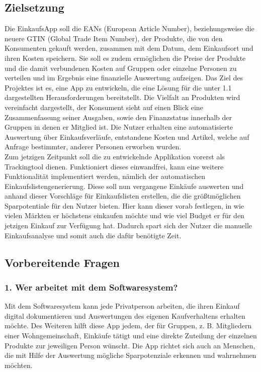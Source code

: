 \documentclass[12pt,a4paper]{article}
\begin{document}
\subsection{Zielsetzung}
Die EinkaufsApp soll die EANs (European Article Number), beziehungsweise die neuere GTIN (Global Trade Item Number), der Produkte, die von den Konsumenten gekauft werden, zusammen mit dem Datum, dem Einkaufsort und ihren Kosten speichern.
Sie soll es zudem ermöglichen die Preise der Produkte und die damit verbundenen Kosten auf Gruppen oder einzelne Personen zu verteilen und im Ergebnis eine finanzielle Auswertung aufzeigen.
Das Ziel des Projektes ist es, eine App zu entwickeln, die eine Lösung für die unter 1.1 dargestellten Herausforderungen bereitstellt. 
Die Vielfalt an Produkten wird vereinfacht dargestellt, der Konsument sieht auf einen Blick eine Zusammenfassung seiner Ausgaben, sowie den Finanzstatus innerhalb der Gruppen in denen er Mitglied ist. Die Nutzer erhalten eine automatisierte Auswertung über Einkaufsverläufe, entstandene Kosten und Artikel, welche auf Anfrage bestimmter, anderer Personen erworben wurden.
\\
Zum jetzigen Zeitpunkt soll die zu entwickelnde Applikation vorerst als Trackingtool dienen. Funktioniert dieses einwandfrei, kann eine weitere Funktionalität implementiert werden, nämlich der automatischen Einkaufslistengenerierung. Diese soll nun vergangene Einkäufe auswerten und anhand dieser Vorschläge für Einkaufslisten erstellen, die die größtmöglichen Sparpotentiale für den Nutzer bieten. Hier kann dieser vorab festlegen, in wie vielen Märkten er höchstens einkaufen möchte und wie viel Budget er für den jetzigen Einkauf zur Verfügung hat. Dadurch spart sich der Nutzer die manuelle Einkaufsanalyse und somit auch die dafür benötigte Zeit.

\subsection{Vorbereitende Fragen}
\subsubsection*{1. Wer arbeitet mit dem Softwaresystem?}
Mit dem Softwaresystem kann jede Privatperson arbeiten, die ihren Einkauf digital dokumentieren und Auswertungen des eigenen Kaufverhaltens erhalten möchte. 
Des Weiteren hilft diese App jedem, der für Gruppen, z. B. Mitgliedern einer Wohngemeinschaft, Einkäufe tätigt und eine direkte Zuteilung der einzelnen Produkte zur jeweiligen Person wünscht. 
Die App richtet sich auch an Menschen, die mit Hilfe der Auswertung mögliche Sparpotenziale erkennen und wahrnehmen möchten. 
\\
\end{document}
